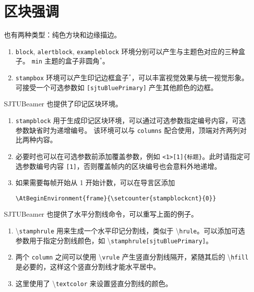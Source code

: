 \documentclass[
    UTF8,
    heading=true,
    12pt,
    a4paper
]{ctexrep}
\newenvironment{commentlist}
{\begin{enumerate}\small}
{\end{enumerate}}
\newcommand{\cmd}[1]{\textbackslash{}\texttt{#1}}
\newcommand{\env}[1]{\texttt{#1}}
\newcommand{\opt}[1]{\texttt{#1}}
\def\themename{\textsf{SJTUBeamer}}
\begin{document}
\section{区块强调}

也有两种类型：纯色方块和边缘描边。



\begin{commentlist}
  \item \env{block}, \env{alertblock},
  \env{exampleblock}
  环境分别可以产生与主题色对应的三种盒子。
  \opt{min} 主题的盒子非圆角$^*$。
  \item \env{stampbox}
  环境可以产生印记边框盒子$^*$，可以丰富视觉效果与统一视觉形象。
  可接受一个可选参数如 \opt{[sjtuBluePrimary]} 产生其他颜色的边框。
\end{commentlist}

\themename{} 也提供了印记区块环境。


\begin{commentlist}
  \item \env{stampblock}
  用于生成印记区块环境，可以通过可选参数指定编号内容，可选参数缺省时为递增编号。
  该环境可以与 \env{columns} 配合使用，顶端对齐两列对比两种内容。
  \item 必要时也可以在可选参数前添加覆盖参数，例如
  \verb"<1>[1]{标题}"。此时请指定可选参数编号内容
  \verb"[1]"，否则覆盖帧内的区块编号也会意料外地递增。
  \item 如果需要每帧开始从 1 开始计数，可以在导言区添加
  \begin{verbatim}
\AtBeginEnvironment{frame}{\setcounter{stampblockcnt}{0}}
  \end{verbatim}
\end{commentlist}

\clearpage

\themename{} 也提供了水平分割线命令，可以重写上面的例子。


\begin{commentlist}
  \item \cmd{stamphrule} 用来生成一个水平印记分割线，类似于
  \cmd{hrule}。可以添加可选参数用于指定分割线颜色，如
  \cmd{stamphrule[sjtuBluePrimary]}。
  \item 两个 \env{column} 之间可以使用 \cmd{vrule}
  产生竖直分割线隔开，紧随其后的 \cmd{hfill}
  是必要的，这样这个竖直分割线才能水平居中。
  \item 这里使用了 \cmd{textcolor} 来设置竖直分割线的颜色。
\end{commentlist}
\end{document}

